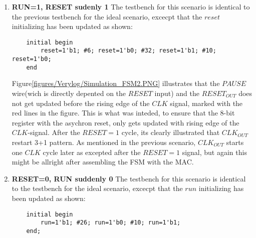 \begin{enumerate}
    \item \textbf{RUN=1, RESET sudenly 1}
    The testbench for this scenario is identical to the previous testbench for the ideal scenario, excecpt that the $reset$ initializing has been updated as shown:
\begin{lstlisting} 
	initial begin
		reset=1'b1; #6; reset=1'b0; #32; reset=1'b1; #10; reset=1'b0;
	end	
\end{lstlisting}
Figure\ref{figures/Verylog/Simulation_FSM2.PNG} illustrates that the $PAUSE$ wire(wich is directly depented on the $RESET$ input) and the $RESET_{OUT}$ does not get updated before the rising edge of the $CLK$ signal, marked with the red lines in the figure. This is what was inteded, to ensure that the 8-bit register with the asychron reset, only gets updated with rising edge of the $CLK$-signal. After the $RESET=1$ cycle, its clearly illustrated that $CLK_{OUT}$ restart 3+1 pattern. As mentioned in the previous scenario, $CLK_{OUT}$ starts one $CLK$ cycle later as excepted after the $RESET=1$ signal, but again this might be allright after assembling the FSM with the MAC.
\item \textbf{RESET=0, RUN suddenly 0}
    The testbench for this scenario is identical to the testbench for the ideal scenario, excecpt that the $run$ initializing has been updated as shown:
\begin{lstlisting} 
	initial begin
		run=1'b1; #26; run=1'b0; #10; run=1'b1;	
	end;
\end{lstlisting}

\end{enumerate}

